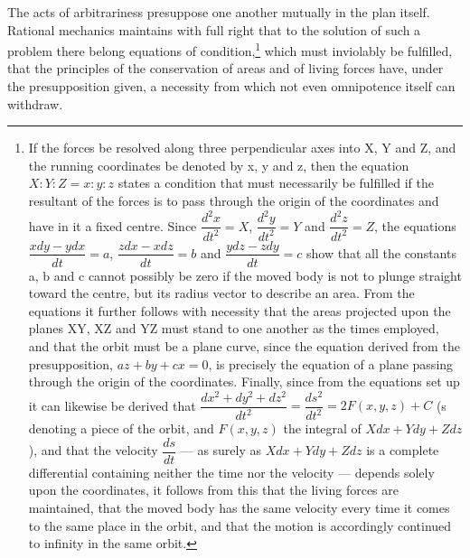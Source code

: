 \documentclass[12pt,a4paper]{book}
\begin{document}
The acts of arbitrariness presuppose one another mutually in the plan itself. Rational mechanics
maintains with full right that to the solution of such a problem there belong equations of
condition,\footnote{%
If the forces be resolved along three perpendicular axes into X, Y and Z, and the running coordinates
be denoted by x, y and z, then the equation $X : Y : Z = x : y : z$ states a condition that must
necessarily be fulfilled if the resultant of the forces is to pass through the origin of the
coordinates and have in it a fixed centre. Since $\dfrac{d^2x}{dt^2} = X$,
$\dfrac{d^2y}{dt^2} = Y$ and $\dfrac{d^2z}{dt^2} = Z$, the equations
$\dfrac{xdy - ydx}{dt} = a$, $\dfrac{zdx - xdz}{dt} = b$ and $\dfrac{ydz - zdy}{dt} = c$ show that
all the constants a, b and c cannot possibly be zero if the moved body is not to plunge straight
toward the centre, but its radius vector to describe an area. From the equations it further follows
with necessity that the areas projected upon the planes XY, XZ and YZ must stand to one another as
the times employed, and that the orbit must be a plane curve, since the equation derived from the
presupposition, $az + by + cx = 0$, is precisely the equation of a plane passing through the origin
of the coordinates. Finally, since from the equations set up it can likewise be derived that
$\dfrac{dx^2 + dy^2 + dz^2}{dt^2} = \dfrac{ds^2}{dt^2} = 2F(x, y, z) + C$
(s denoting a piece of the orbit, and $F(x, y, z)$ the integral of $Xdx + Ydy + Zdz$), and that the
velocity $\dfrac{ds}{dt}$ --- as surely as $Xdx + Ydy + Zdz$ is a complete differential containing
neither the time nor the velocity --- depends solely upon the coordinates, it follows from this that
the living forces are maintained, that the moved body has the same velocity every time it comes to
the same place in the orbit, and that the motion is accordingly continued to infinity in the same
orbit.} which must inviolably be fulfilled, that
the principles of the conservation of areas and of living forces have, under the presupposition
given, a necessity from which not even omnipotence itself can withdraw.
\end{document}
